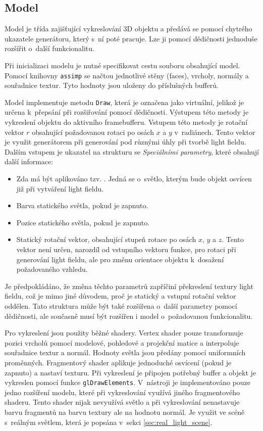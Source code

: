 \subsection{Model}
\label{sec:model_impl}
Model je třída zajišťující vykreslování 3D objektu a předává se pomocí chytrého ukazatele generátoru, který s~ní poté pracuje. Lze ji pomocí dědičnosti jednoduše rozšířit o~další funkcionalitu. 

Při inicializaci modelu je nutné specifikovat cestu souboru obsahující model. Pomocí knihovny \texttt{assimp} se načtou jednotlivé stěny (faces), vrcholy, normály a souřadnice textur. Tyto hodnoty jsou uloženy do příslušných bufferů. 

Model implementuje metodu \texttt{Draw}, která je označena jako virtuální, jelikož je určena k~přepsání při rozšiřování pomocí dědičnosti. Výstupem této metody je vykreslení objektu do aktivního framebufferu. Vstupem této metody je rotační vektor $r$ obsahující požadovanou rotaci po osách $x$ a $y$ v~radiánech. Tento vektor je využit generátorem při generování pod různými úhly při tvorbě light fieldu. Dalším vstupem je ukazatel na strukturu se \emph{Speciálními parametry}, které obsahují další informace:
\begin{itemize}
    \item Zda má být aplikováno tzv. . Jedná se o~světlo, kterým bude objekt osvícen již při vytváření light fieldu.
    \item Barva statického světla, pokud je zapnuto.
    \item Pozice statického světla, pokud je zapnuto.
    \item Statický rotační vektor, obsahující stupeň rotace po osách $x$, $y$ a $z$. Tento vektor není určen, narozdíl od vstupního vektoru funkce, pro rotaci při generování light fieldu, ale pro změnu orientace objektu k~dosažení požadovaného vzhledu.
\end{itemize}
Je předpokládáno, že změna těchto parametrů zapříčiní překreslení textury light fieldu, což je mimo jiné důvodem, proč je statický a vstupní rotační vektor oddělen. Tato struktura může být také rozšířena o~další parametry pomocí dědičnosti, ale současně musí být rozšířen i model o~požadovanou funkcionalitu.

Pro vykreslení jsou použity běžné shadery. Vertex shader pouze transformuje pozici vrcholů pomocí modelové, pohledové a projekční matice a interpoluje souřadnice textur a normál. Hodnoty světla jsou předány pomocí uniformních proměnných. Fragmentový shader aplikuje jednoduché osvícení (pokud je zapnuto) a nastaví texturu. Při vykreslení je připojen potřebný buffer a objekt je vykreslen pomocí funkce \texttt{glDrawElements}.
\label{sec:implemented_extensions}
V~nástroji je implementováno pouze jedno rozšíření modelu, které při vykreslování využívá jiného fragmentového shaderu. Tento shader nijak nevyužívá světlo a při vykreslování nenastavuje barvu fragmentů na barvu textury ale na hodnotu normál. Je využit ve scéně s~reálným světlem, která je popsána v~sekci \ref{sec:real_light_scene}. 

